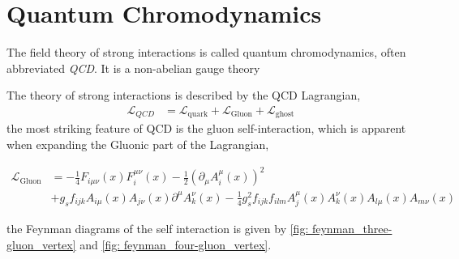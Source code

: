 \documentclass[main.tex]{subfiles}
\begin{document}
\section{Quantum Chromodynamics}\label{sec: QCD}
The field theory of strong interactions is called quantum chromodynamics, often abbreviated \textit{QCD}. It is a non-abelian gauge theory 

The theory of strong interactions is described by the QCD Lagrangian,
\begin{align}\label{eqn: QCD_lagrangian_full}
    \mathcal{L}_{QCD} &= \mathcal{L}_{\text{quark}} + \mathcal{L}_{\text{Gluon}} + \mathcal{L}_{\text{ghost}}
\end{align}
the most striking feature of QCD is the gluon self-interaction, which is apparent when expanding the Gluonic part of the Lagrangian, 

\begin{align}
    \mathcal{L}_{\text{Gluon}} 
    &= - \frac{1}{4} F_{i\mu\nu}(x) F_i^{\mu\nu}(x) - \frac{1}{2} \left( \partial_\mu A_i^\mu(x)\right)^2 \label{eqn: QCD_Lpart_gluon}  \\
    &+ g_s f_{ijk} A_{i\mu}(x)A_{j\nu}(x) \partial^\mu A_k^\nu(x) - \frac{1}{4} g_s^2 f_{ijk} f_{ilm} A_j^\mu(x) A_k^\nu(x) A_{l\mu}(x) A_{m\nu}(x) \nonumber
\end{align}

the Feynman diagrams of the self interaction is given by \autoref{fig: feynman_three-gluon_vertex} and \autoref{fig: feynman_four-gluon_vertex}.
\end{document}
